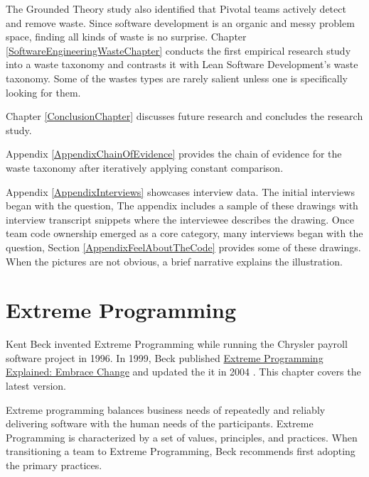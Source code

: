 The Grounded Theory study also identified that Pivotal teams actively detect and remove waste. Since software development is an organic and messy problem space, finding all kinds of waste is no surprise. Chapter \ref{SoftwareEngineeringWasteChapter} conducts the first empirical research study into a waste taxonomy and contrasts it with Lean Software Development's waste taxonomy. Some of the wastes types are rarely salient unless one is specifically looking for them.

Chapter \ref{ConclusionChapter} discusses future research and concludes the research study. 

Appendix \ref{AppendixChainOfEvidence} provides the chain of evidence for the waste taxonomy after iteratively applying constant comparison. 

Appendix \ref{AppendixInterviews} showcases interview data. The initial interviews began with the question,  The appendix includes a sample of these drawings with interview transcript snippets where the interviewee describes the drawing. Once team code ownership emerged as a core category, many interviews began with the question,  Section \ref{AppendixFeelAboutTheCode} provides some of these drawings. When the pictures are not obvious, a brief narrative explains the illustration.


\chapter{Extreme Programming}
\label{ExtremeProgramming}

Kent Beck invented Extreme Programming while running the Chrysler payroll software project in 1996. \cite{BeckExtremeProgramming1999} In 1999, Beck published \underline{Extreme Programming Explained: Embrace Change}  \cite{BeckExtremeProgramming1999} and updated the it in 2004  \cite{BeckExtremeProgramming2004}. This chapter covers the latest version. 

Extreme programming balances business needs of repeatedly and reliably delivering software with the human needs of the participants. Extreme Programming is characterized by a set of values, principles, and practices. When transitioning a team to Extreme Programming, Beck recommends first adopting the primary practices. 
